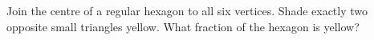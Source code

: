 Join the centre of a regular hexagon to all six vertices. Shade exactly two opposite small triangles yellow. What fraction of the hexagon is yellow?
